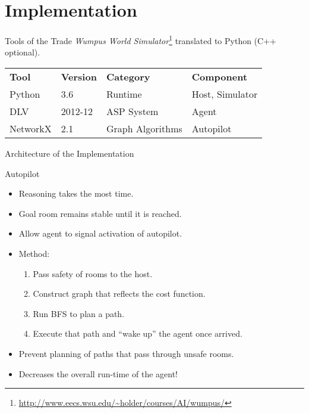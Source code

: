 \documentclass[smaller,dvipsnames,ratio=169,10pt]{beamer}
\begin{document}
  \section{Implementation}
  

  \begin{frame}{Tools of the Trade}
  \emph{Wumpus World Simulator}\footnote{\url{http://www.eecs.wsu.edu/~holder/courses/AI/wumpus/}} translated to Python (C++ optional).

  \begin{center}
  \begin{tabular}{llll}
    \textbf{Tool} & \textbf{Version} & \textbf{Category} & \textbf{Component} \\
    Python & 3.6 & Runtime & Host, Simulator \\
    DLV & 2012-12 & ASP System & Agent\\
    NetworkX & 2.1 & Graph Algorithms & Autopilot\\
  \end{tabular}
  \end{center}
  \end{frame}  
  
  \begin{frame}{Architecture of the Implementation}
		\resizebox{1.0\textwidth}{0.55\textheight}{
			
		}
  \end{frame}

  \begin{frame}{Autopilot}
  	\begin{itemize}
  		\item Reasoning takes the most time.
  		\item Goal room remains stable until it is reached.
  		\item Allow agent to signal activation of autopilot.
  		\item Method: \begin{enumerate}
  		\item Pass safety of rooms to the host.
  		\item Construct graph that reflects the cost function.
  		\item Run BFS to plan a path.
  		\item Execute that path and \enquote{wake up} the agent once arrived.
  		\end{enumerate}
  		\item Prevent planning of paths that pass through unsafe rooms.		  		
		\item Decreases the overall run-time of the agent!
  	\end{itemize}
  \end{frame}
  
\end{document}
